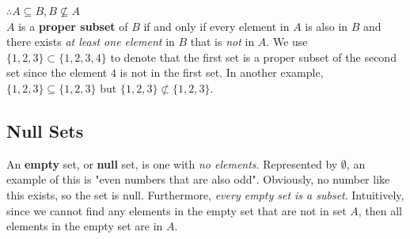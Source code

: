         \noindent $\therefore A \subseteq B, B\not\subseteq A$ \\
        \noindent $A$ is a \textbf{proper subset} of $B$ if and only if every element in $A$ is
        also in $B$ and there exists \textit{at least one element} in $B$ that is \textit{not}
        in $A$. We use $\{1,2,3\}\subset\{1,2,3,4\}$ to denote that the first set is a proper
        subset of the second set since the element $4$ is not in the first set. In another
        example, $\{1,2,3\}\subseteq\{1,2,3\}$ but $\{1,2,3\}\not\subset\{1,2,3\}$.



    \subsection{Null Sets}
        An \textbf{empty} set, or \textbf{null} set, is one with \textit{no elements}.
        Represented by $\emptyset$, an example of this is "even numbers that are also odd".
        Obviously, no number like this exists, so the set is null. Furthermore,
        \textit{every empty set is a subset}. Intuitively, since we cannot find any elements
        in the empty set that are not in set $A$, then all elements in the empty set are in $A$.